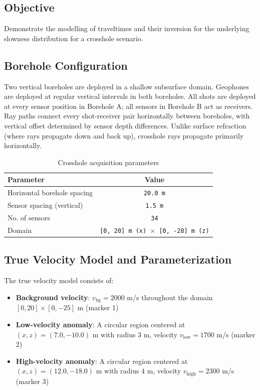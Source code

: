 \subsection*{Objective}
Demonstrate the modelling of traveltimes and their inversion for the underlying slowness distribution for a crosshole scenario.

\subsection*{Borehole Configuration}
Two vertical boreholes are deployed in a shallow subsurface domain. Geophones are deployed at regular vertical intervals in both boreholes. All shots are deployed at every sensor position in Borehole A; all sensors in Borehole B act as receivers. Ray paths connect every shot-receiver pair horizontally between boreholes, with vertical offset determined by sensor depth differences. Unlike surface refraction (where rays propagate down and back up), crosshole rays propagate primarily horizontally.
\begin{table}[H]
\small
\centering
\caption{Crosshole acquisition parameters}
\label{tab:crosshole_acquisition}
\begin{tabular}{|l|c|}
\hline
\textbf{Parameter} & \textbf{Value} \\
\hline
Horizontal borehole spacing & \texttt{20.0 m} \\
Sensor spacing (vertical) & \texttt{1.5 m} \\
No. of sensors & \texttt{34} \\
Domain & \texttt{[0, 20] m (x) $\times$ [0, -28] m (z)} \\
\hline
\end{tabular}
\end{table}

\subsection*{True Velocity Model and Parameterization}

The true velocity model consists of:

\begin{itemize}
    \item \textbf{Background velocity}: $v_{\text{bg}} = 2000$ m/s throughout the domain $[0, 20] \times [0, -25]$ m (marker 1)
    \item \textbf{Low-velocity anomaly}: A circular region centered at $(x, z) = (7.0, -10.0)$ m with radius 3 m, velocity $v_{\text{low}} = 1700$ m/s (marker 2)
    \item \textbf{High-velocity anomaly}: A circular region centered at $(x, z) = (12.0, -18.0)$ m with radius 4 m, velocity $v_{\text{high}} = 2300$ m/s (marker 3)
\end{itemize}

